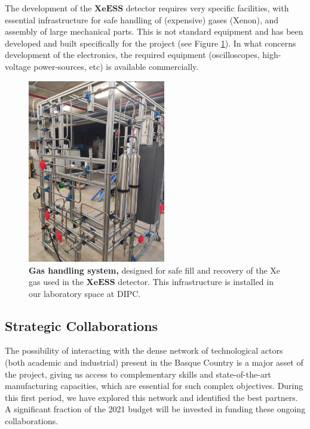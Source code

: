 \documentclass[12pt,a4paper,article]{report} %
\begin{document}
The development of the  $\mathbf{XeESS}$ detector requires very specific facilities, with essential infrastructure for safe handling of (expensive) gases (Xenon), and assembly of large mechanical parts. This is not standard equipment and has been developed and built specifically for the project (see Figure \ref{gascircuit}). In what concerns development of the electronics, the required equipment (oscilloscopes, high-voltage power-sources, etc) is available commercially.  

\begin{figure}[htbp]
\begin{center}
\includegraphics[width=6cm]{gascircuit}
\caption{\textbf{Gas handling system,} designed for safe fill and recovery of the Xe gas used in the $\mathbf{XeESS}$ detector. This infrastructure is installed in our laboratory space at DIPC.}
\label{gascircuit}
\end{center}
\end{figure}

\subsection*{Strategic Collaborations}
The possibility of interacting with the dense network of technological actors (both academic and industrial) present in the Basque Country is a major asset of the project, giving us access to complementary skills and state-of-the-art manufacturing capacities, which are essential for such complex objectives. During this first period, we have explored this network and identified the best partners.  A significant fraction of the 2021 budget will be invested in funding these ongoing collaborations. 
\end{document}
